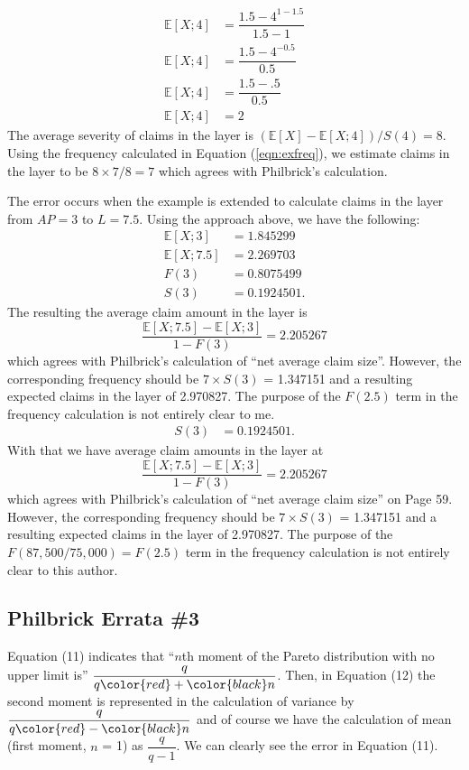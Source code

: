 \begin{align}
\mathbb{E}[X; 4] &= \dfrac{1.5 - 4^{1-1.5}}{1.5-1}\nonumber\\
\mathbb{E}[X; 4] &= \dfrac{1.5 - 4^{-0.5}}{0.5}\nonumber\\
\mathbb{E}[X; 4] &= \dfrac{1.5 - .5}{0.5}\nonumber\\
\mathbb{E}[X; 4] &= 2\nonumber
\end{align}
The average severity of claims in the layer is $(\mathbb{E}[X] - \mathbb{E}[X; 4]) / S(4) = 8$. Using the frequency calculated in Equation (\ref{eqn:exfreq}), we estimate claims in the layer to be $8 \times 7 / 8 = 7$ which agrees with Philbrick's calculation.

The error occurs when the example is extended to calculate claims in the layer from $AP = 3$ to $L = 7.5$. Using the approach above, we have the following:
\begin{align}
\mathbb{E}[X;3] &= 1.845299\nonumber\\
\mathbb{E}[X;7.5] &= 2.269703\nonumber\\
F(3) &= 0.8075499\nonumber\\
S(3) &= 0.1924501.\nonumber
\end{align}
The resulting the average claim amount in the layer is 
\begin{equation}
\frac{\mathbb{E}[X;7.5] - \mathbb{E}[X;3]}{1 - F(3)} = 2.205267 \nonumber
\end{equation}
which agrees with Philbrick's calculation of ``net average claim size''. However, the corresponding frequency should be $ 7 \times S(3)$ = 1.347151 and a resulting expected claims in the layer of 2.970827. The purpose of the $F(2.5)$ term in the frequency calculation is not entirely clear to me. 
\begin{align}
S(3) &= 0.1924501\nonumber.
\end{align}
With that we have average claim amounts in the layer at 
\begin{equation}
\frac{\mathbb{E}[X;7.5] - \mathbb{E}[X;3]}{1 - F(3)} = 2.205267 \nonumber
\end{equation}
which agrees with Philbrick's calculation of ``net average claim size'' on Page 59. However, the corresponding frequency should be $ 7 \times S(3)$ = 1.347151 and a resulting expected claims in the layer of 2.970827. The purpose of the $F(87,500/75,000) = F(2.5)$ term in the frequency calculation is not entirely clear to this author. 

\subsection{Philbrick Errata \#3}
Equation (11) indicates that ``$n$th moment of the Pareto distribution with no upper limit is'' $\dfrac{q}{q \color{red}+\color{black} n}$. Then, in Equation (12) the second moment is represented in the calculation of variance by $\dfrac{q}{q \color{red}-\color{black} n}$ and of course we have the calculation of mean (first moment, $n$ = 1) as $\dfrac{q}{q - 1}$. We can clearly see the error in Equation (11).